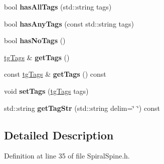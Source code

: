 \begin{DoxyCompactItemize}
\item 
\hypertarget{classtg_taggable_a33b77b1075171b63f673965687b2e844}{bool {\bfseries has\-All\-Tags} (std\-::string tags)}\label{classtg_taggable_a33b77b1075171b63f673965687b2e844}

\item 
\hypertarget{classtg_taggable_af14af28fa98021c4f20a5e8f2ddd5606}{bool {\bfseries has\-Any\-Tags} (const std\-::string tags)}\label{classtg_taggable_af14af28fa98021c4f20a5e8f2ddd5606}

\item 
\hypertarget{classtg_taggable_adff345e116e16420c701a748ff8f995f}{bool {\bfseries has\-No\-Tags} ()}\label{classtg_taggable_adff345e116e16420c701a748ff8f995f}

\item 
\hypertarget{classtg_taggable_acf1d7fa9df8f374f25015c4080902681}{\hyperlink{classtg_tags}{tg\-Tags} \& {\bfseries get\-Tags} ()}\label{classtg_taggable_acf1d7fa9df8f374f25015c4080902681}

\item 
\hypertarget{classtg_taggable_ae70d7d3b45301665bc363b0ed8b9b292}{const \hyperlink{classtg_tags}{tg\-Tags} \& {\bfseries get\-Tags} () const }\label{classtg_taggable_ae70d7d3b45301665bc363b0ed8b9b292}

\item 
\hypertarget{classtg_taggable_a5492888e4e4da4cca6261070b5726adf}{void {\bfseries set\-Tags} (\hyperlink{classtg_tags}{tg\-Tags} tags)}\label{classtg_taggable_a5492888e4e4da4cca6261070b5726adf}

\item 
\hypertarget{classtg_taggable_a346d66b066d2d9eb1eadba01da43749f}{std\-::string {\bfseries get\-Tag\-Str} (std\-::string delim=\char`\"{} \char`\"{}) const }\label{classtg_taggable_a346d66b066d2d9eb1eadba01da43749f}

\end{DoxyCompactItemize}


\subsection{Detailed Description}


Definition at line 35 of file Spiral\-Spine.\-h.




